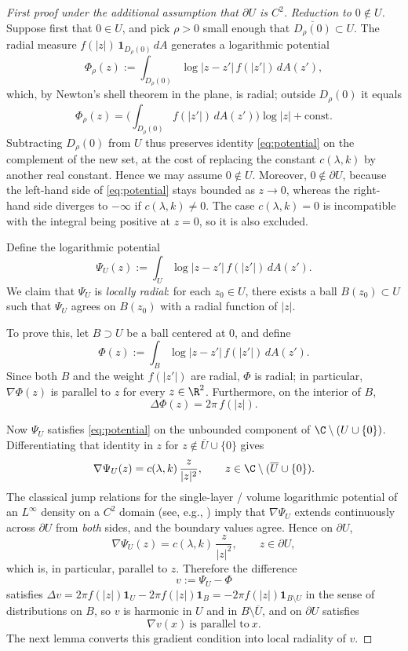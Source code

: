 \begin{proof}[First proof under the additional assumption that $\partial U$ is $C^2$]
\medskip

\noindent\emph{Reduction to $0\notin U$.}\quad
Suppose first that $0\in U$, and pick $\rho>0$ small enough that
$\overline{D_\rho(0)}\subset U$. The radial measure
$f(|z|)\,\mathbf{1}_{D_\rho(0)}\,dA$ generates a logarithmic potential
\[
\Phi_\rho(z):=\int_{D_\rho(0)} \log|z-z'|\, f(|z'|)\,dA(z'),
\]
which, by Newton's shell theorem in the plane, is radial; outside
$D_\rho(0)$ it equals
\[
\Phi_\rho(z)=\Big(\int_{D_\rho(0)}f(|z'|)\,dA(z')\Big)\log|z|+\text{const}.
\]
Subtracting $D_\rho(0)$ from $U$ thus preserves identity
\eqref{eq:potential} on the complement of the new set, at the cost of
replacing the constant $c(\lambda,k)$ by another real constant. Hence we
may assume $0\notin U$. Moreover, $0\notin \partial U$, because the
left-hand side of \eqref{eq:potential} stays bounded as $z\to 0$, whereas
the right-hand side diverges to $-\infty$ if $c(\lambda,k)\neq 0$.
The case $c(\lambda,k)=0$ is incompatible with the integral being
positive at $z=0$, so it is also excluded.

\medskip

Define the logarithmic potential
\[
\Psi_U(z):=\int_U \log|z-z'|\, f(|z'|)\,dA(z').
\]
We claim that $\Psi_U$ is \emph{locally radial}: for each $z_0\in U$,
there exists a ball $B(z_0)\subset U$ such that $\Psi_U$ agrees on
$B(z_0)$ with a radial function of $|z|$.

To prove this, let $B\supset U$ be a ball centered at $0$, and define
\[
\Phi(z):=\int_B \log|z-z'|\, f(|z'|)\,dA(z').
\]
Since both $B$ and the weight $f(|z'|)$ are radial, $\Phi$ is radial; in
particular, $\nabla \Phi(z)$ is parallel to $z$ for every $z\in \R^2$.
Furthermore, on the interior of $B$,
\[
\Delta \Phi(z)=2\pi\, f(|z|).
\]

Now $\Psi_U$ satisfies \eqref{eq:potential} on the unbounded
component of $\C\setminus(U\cup\{0\})$. Differentiating that identity
in $z$ for $z\not\in \overline{U}\cup\{0\}$ gives
\[
\nabla \Psi_U(z)=c(\lambda,k)\,\frac{z}{|z|^2},
\qquad z\in \C\setminus(\overline{U}\cup\{0\}).
\]
The classical jump relations for the single-layer / volume logarithmic
potential of an $L^\infty$ density on a $C^2$ domain (see, e.g.,
\cite{Gustafsson}) imply that $\nabla\Psi_U$ extends continuously
across $\partial U$ from \emph{both} sides, and the boundary values
agree. Hence on $\partial U$,
\[
\nabla \Psi_U(z)=c(\lambda,k)\,\frac{z}{|z|^2},
\qquad z\in \partial U,
\]
which is, in particular, parallel to $z$. Therefore the difference
\[
v:=\Psi_U-\Phi
\]
satisfies $\Delta v=2\pi f(|z|)\mathbf 1_U-2\pi f(|z|)\mathbf 1_B
=-2\pi f(|z|)\mathbf 1_{B\setminus U}$ in the sense of distributions
on $B$, so $v$ is harmonic in $U$ and in $B\setminus\overline{U}$, and
on $\partial U$ satisfies
\[
\nabla v(x)\ \text{is parallel to}\ x.
\]
The next lemma converts this gradient condition into local radiality of $v$.


\end{proof}
